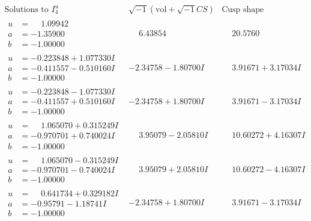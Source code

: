 \documentclass[1p]{elsarticle_modified}
\theoremstyle{definition}
\newcommand{\I}{\sqrt{-1}}
\begin{document}
$$\begin{array}{c|c|c}  
\text{Solutions to }I^u_{4}& \I (\text{vol} + \sqrt{-1}CS) & \text{Cusp shape}\\
 \hline 
\begin{aligned}
u &= \phantom{-}1.09942\phantom{ +0.000000I} \\
a &= -1.35900\phantom{ +0.000000I} \\
b &= -1.00000\phantom{ +0.000000I}\end{aligned}
 & \phantom{-}6.43854\phantom{ +0.000000I} & \phantom{-}20.5760\phantom{ +0.000000I} \\ \hline\begin{aligned}
u &= -0.223848 + 1.077330 I \\
a &= -0.411557 - 0.510160 I \\
b &= -1.00000\phantom{ +0.000000I}\end{aligned}
 & -2.34758 - 1.80700 I & \phantom{-}3.91671 + 3.17034 I \\ \hline\begin{aligned}
u &= -0.223848 - 1.077330 I \\
a &= -0.411557 + 0.510160 I \\
b &= -1.00000\phantom{ +0.000000I}\end{aligned}
 & -2.34758 + 1.80700 I & \phantom{-}3.91671 - 3.17034 I \\ \hline\begin{aligned}
u &= \phantom{-}1.065070 + 0.315249 I \\
a &= -0.970701 + 0.740024 I \\
b &= -1.00000\phantom{ +0.000000I}\end{aligned}
 & \phantom{-}3.95079 - 2.05810 I & \phantom{-}10.60272 + 4.16307 I \\ \hline\begin{aligned}
u &= \phantom{-}1.065070 - 0.315249 I \\
a &= -0.970701 - 0.740024 I \\
b &= -1.00000\phantom{ +0.000000I}\end{aligned}
 & \phantom{-}3.95079 + 2.05810 I & \phantom{-}10.60272 - 4.16307 I \\ \hline\begin{aligned}
u &= \phantom{-}0.641734 + 0.329182 I \\
a &= -0.95791 - 1.18741 I \\
b &= -1.00000\phantom{ +0.000000I}\end{aligned}
 & -2.34758 + 1.80700 I & \phantom{-}3.91671 - 3.17034 I \\ \hline\begin{aligned}

\end{aligned}
\end{array}$$
\end{document}
